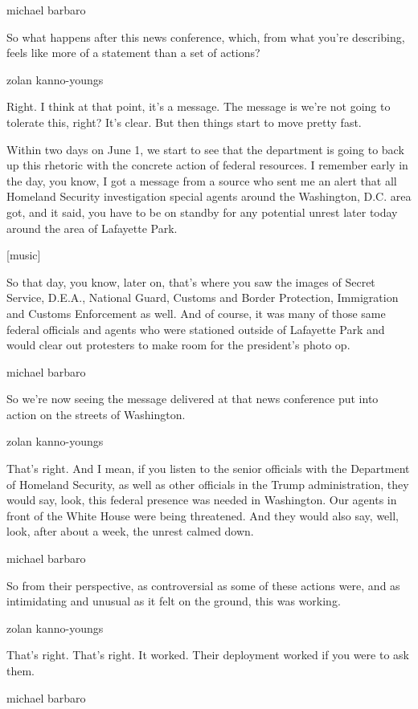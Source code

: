 michael barbaro

So what happens after this news conference, which, from what you're
describing, feels like more of a statement than a set of actions?

zolan kanno-youngs

Right. I think at that point, it's a message. The message is we're not
going to tolerate this, right? It's clear. But then things start to move
pretty fast.

Within two days on June 1, we start to see that the department is going
to back up this rhetoric with the concrete action of federal resources.
I remember early in the day, you know, I got a message from a source who
sent me an alert that all Homeland Security investigation special agents
around the Washington, D.C. area got, and it said, you have to be on
standby for any potential unrest later today around the area of
Lafayette Park.

{[}music{]}

So that day, you know, later on, that's where you saw the images of
Secret Service, D.E.A., National Guard, Customs and Border Protection,
Immigration and Customs Enforcement as well. And of course, it was many
of those same federal officials and agents who were stationed outside of
Lafayette Park and would clear out protesters to make room for the
president's photo op.

michael barbaro

So we're now seeing the message delivered at that news conference put
into action on the streets of Washington.

zolan kanno-youngs

That's right. And I mean, if you listen to the senior officials with the
Department of Homeland Security, as well as other officials in the Trump
administration, they would say, look, this federal presence was needed
in Washington. Our agents in front of the White House were being
threatened. And they would also say, well, look, after about a week, the
unrest calmed down.

michael barbaro

So from their perspective, as controversial as some of these actions
were, and as intimidating and unusual as it felt on the ground, this was
working.

zolan kanno-youngs

That's right. That's right. It worked. Their deployment worked if you
were to ask them.

michael barbaro

